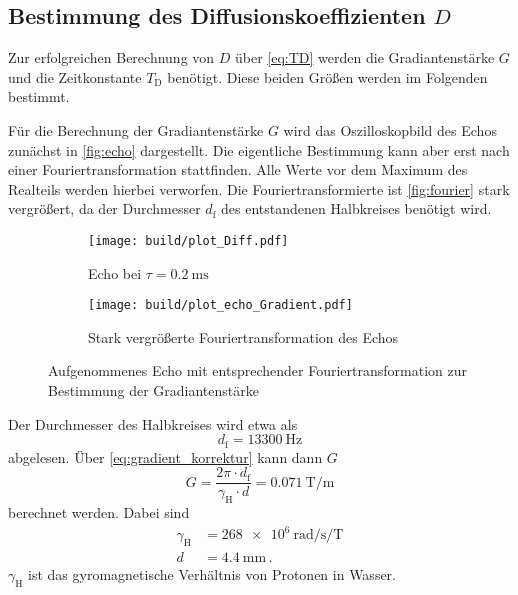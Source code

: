 \subsection{Bestimmung des Diffusionskoeffizienten \texorpdfstring{$D$}{D}}
\label{ssec:aus3}

Zur erfolgreichen Berechnung von $D$ über \autoref{eq:TD} werden die Gradiantenstärke $G$ und die Zeitkonstante $T_\text{D}$ benötigt. 
Diese beiden Größen werden im Folgenden bestimmt.

Für die Berechnung der Gradiantenstärke $G$ wird das Oszilloskopbild des Echos zunächst in \autoref{fig:echo} dargestellt.
Die eigentliche Bestimmung kann aber erst nach einer Fouriertransformation stattfinden. 
Alle Werte vor dem Maximum des Realteils werden hierbei verworfen.
Die Fouriertransformierte ist \autoref{fig:fourier} stark vergrößert, da der Durchmesser $d_\text{f}$ des entstandenen Halbkreises benötigt wird.

\begin{figure}
    \centering
    \begin{subfigure}{0.4\textwidth}
        \centering
        \texttt{[image: build/plot\_Diff.pdf]}
        \caption{Echo bei $\tau = \SI{0.2}{\milli\second}$}
        \label{fig:echo}
    \end{subfigure}
    \begin{subfigure}{0.4\textwidth}
        \centering
        \texttt{[image: build/plot\_echo\_Gradient.pdf]}
        \caption{Stark vergrößerte Fouriertransformation des Echos}
        \label{fig:fourier}
    \end{subfigure}
    \caption{Aufgenommenes Echo mit entsprechender Fouriertransformation zur Bestimmung der Gradiantenstärke}
    \label{fig:g_messung}
\end{figure}

Der Durchmesser des Halbkreises wird etwa als 
\begin{equation*}
    d_\text{f} = \SI{13300}{\hertz} 
    \label{eq:df}
\end{equation*}
abgelesen.
Über \autoref{eq:gradient_korrektur} kann dann $G$ 
\begin{equation}
    G = \frac{2 \pi \cdot d_\text{f}}{\gamma _\text{H} \cdot d} = \SI{0.071}{\tesla\per\meter}
    \label{eq:g_wert}
\end{equation}
berechnet werden.
Dabei sind
\begin{align*}
    \gamma _\text{H} &=  \SI{268e6}{\radian\per\second\per\tesla} \\
    d &=  \SI{4.4}{\milli\meter} \, . 
\end{align*}
$\gamma _\text{H}$ ist das gyromagnetische Verhältnis von Protonen in Wasser. \cite{physics_constants}

